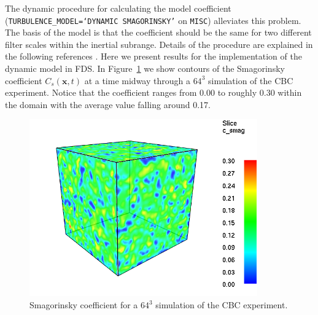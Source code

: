 \documentclass[11pt]{book}
\begin{document}
The dynamic procedure for calculating the model coefficient ({\tt TURBULENCE\_MODEL=`DYNAMIC SMAGORINSKY'} on {\tt MISC}) alleviates this problem.  The basis of the model is that the coefficient should be the same for two different filter scales within the inertial subrange.  Details of the procedure are explained in the following references \cite{Germano:1991,PinoMartin:2000,Moin:1991,Lund:1997,FDS_Math_Guide}.  Here we present results for the implementation of the dynamic model in FDS.  In Figure~\ref{fig_c_smag} we show contours of the Smagorinsky coefficient $C_s(\mathbf{x},t)$ at a time midway through a $64^3$ simulation of the CBC experiment.  Notice that the coefficient ranges from 0.00 to roughly 0.30 within the domain with the average value falling around 0.17.

\begin{figure}[t]
   \begin{center}
      \includegraphics[height=3.00in]{SCRIPT_FIGURES/dsmag_64_300}
      \caption{\label{fig_c_smag} Smagorinsky coefficient for a $64^3$ simulation of the CBC experiment.}
   \end{center}
\end{figure}
\end{document}
